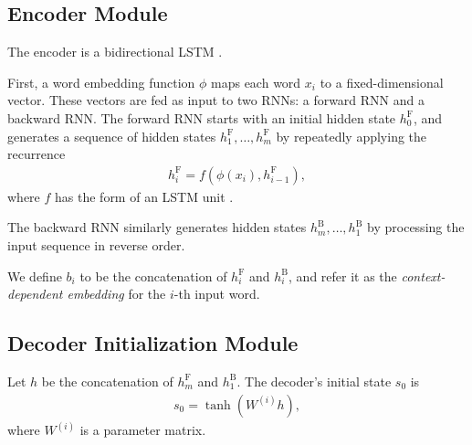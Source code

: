 \documentclass[11pt,letterpaper]{article}
\newcommand{\phiin}{\phi}
\newcommand\pl[1]{}
\newcommand\rj[1]{}
\begin{document}
\pl{
  Also need at least one (probably two) figure(s)
  to illustrate (i) the abstract model framework,
  and (ii) a concrete example.  Use the same example as in Figure 1.
}
\rj{First figure made.  Second figure seems like it would need to be quite big?}


\subsection{Encoder Module}
The encoder is a bidirectional LSTM \cite{bahdanau2014neural}.
\rj{Maybe cite the thing bahdanau cites too}

First, a word embedding function $\phiin$ 
maps each word $x_i$ to a fixed-dimensional vector.
These vectors are fed as input to two RNNs: a forward RNN and a backward RNN.
The forward RNN starts with an initial hidden state $h_0^{\text{F}}$,
and generates a sequence of hidden states $h_1^{\text{F}}, \dotsc, h_m^{\text{F}}$ by
repeatedly applying the recurrence 
\begin{align}
  h_i^{\text{F}} = f(\phiin(x_i), h_{i-1}^{\text{F}}),
\end{align}
where $f$ has the form of an LSTM unit \cite{hochreiter1997lstm}.
\pl{technically, does $h_i$ need to include the cell variables?}
\rj{In this case, yes. I didn't try excluding the cell.}
\pl{technically, LSTM refers to the entire model, not just one local update}
\rj{I've seen this phrasing elsewhere
e.g. http://arxiv.org/pdf/1409.0473v6.pdf bottom of page 2.
Do you think saying ``LSTM unit'' is better?}
The backward RNN similarly generates hidden states $h_m^{\text{B}}, \dotsc, h_1^{\text{B}}$
by processing the input sequence in reverse order.

We define $b_i$ to be the concatenation of $h_i^{\text{F}}$ and $h_i^{\text{B}}$,
and refer it as the \emph{context-dependent embedding} for the $i$-th input word.
\pl{$\phiin(x_i)$ is notationally pretty clunky; come up with a single letter?}
\pl{what's $\phi(x_i)$?}
\rj{is this better?  Or did you have something else in mind?}

\subsection{Decoder Initialization Module}
Let $h$ be the concatenation of $h_m^{\text{F}}$ and $h_1^{\text{B}}$.
The decoder's initial state $s_0$ is
\begin{align}
  s_0 = \tanh(W^{(i)} h),
\end{align}
where $W^{(i)}$ is a parameter matrix.
\end{document}
